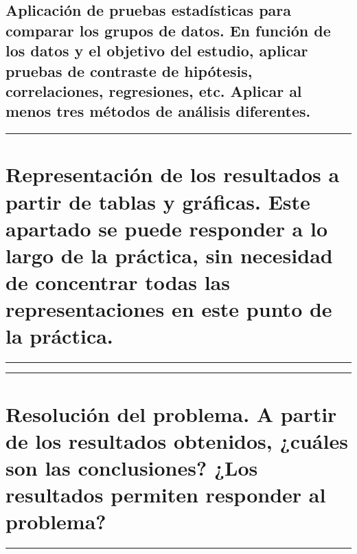 \documentclass[
]{article}
\begin{document}
\hypertarget{aplicaciuxf3n-de-pruebas-estaduxedsticas-para-comparar-los-grupos-de-datos.-en-funciuxf3n-de-los-datos-y-el-objetivo-del-estudio-aplicar-pruebas-de-contraste-de-hipuxf3tesis-correlaciones-regresiones-etc.-aplicar-al-menos-tres-muxe9todos-de-anuxe1lisis-diferentes.}{%
\subsection{Aplicación de pruebas estadísticas para comparar los grupos
de datos. En función de los datos y el objetivo del estudio, aplicar
pruebas de contraste de hipótesis, correlaciones, regresiones, etc.
Aplicar al menos tres métodos de análisis
diferentes.}\label{aplicaciuxf3n-de-pruebas-estaduxedsticas-para-comparar-los-grupos-de-datos.-en-funciuxf3n-de-los-datos-y-el-objetivo-del-estudio-aplicar-pruebas-de-contraste-de-hipuxf3tesis-correlaciones-regresiones-etc.-aplicar-al-menos-tres-muxe9todos-de-anuxe1lisis-diferentes.}}

\begin{center}\rule{0.5\linewidth}{0.5pt}\end{center}

\hypertarget{representaciuxf3n-de-los-resultados-a-partir-de-tablas-y-gruxe1ficas.-este-apartado-se-puede-responder-a-lo-largo-de-la-pruxe1ctica-sin-necesidad-de-concentrar-todas-las-representaciones-en-este-punto-de-la-pruxe1ctica.}{%
\section{Representación de los resultados a partir de tablas y gráficas.
Este apartado se puede responder a lo largo de la práctica, sin
necesidad de concentrar todas las representaciones en este punto de la
práctica.}\label{representaciuxf3n-de-los-resultados-a-partir-de-tablas-y-gruxe1ficas.-este-apartado-se-puede-responder-a-lo-largo-de-la-pruxe1ctica-sin-necesidad-de-concentrar-todas-las-representaciones-en-este-punto-de-la-pruxe1ctica.}}

\begin{center}\rule{0.5\linewidth}{0.5pt}\end{center}

\begin{center}\rule{0.5\linewidth}{0.5pt}\end{center}

\hypertarget{resoluciuxf3n-del-problema.-a-partir-de-los-resultados-obtenidos-cuuxe1les-son-las-conclusiones-los-resultados-permiten-responder-al-problema}{%
\section{Resolución del problema. A partir de los resultados obtenidos,
¿cuáles son las conclusiones? ¿Los resultados permiten responder al
problema?}\label{resoluciuxf3n-del-problema.-a-partir-de-los-resultados-obtenidos-cuuxe1les-son-las-conclusiones-los-resultados-permiten-responder-al-problema}}

\begin{center}\rule{0.5\linewidth}{0.5pt}\end{center}
\end{document}
